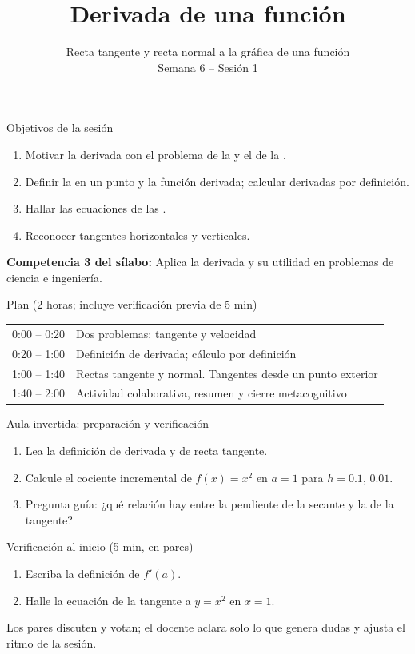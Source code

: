 \documentclass[10pt,aspectratio=169]{beamer}
\title[La derivada]{Derivada de una función}
\subtitle{Recta tangente y recta normal a la gráfica de una función\\[2pt]\small Semana 6 -- Sesión 1}
\begin{document}
\begin{frame}
  \titlepage
\end{frame}

\begin{frame}{Objetivos de la sesión}
  \begin{enumerate}
    \item Motivar la derivada con el problema de la  y el de la .
    \item Definir la  en un punto y la función derivada; calcular derivadas por definición.
    \item Hallar las ecuaciones de las .
    \item Reconocer tangentes horizontales y verticales.
  \end{enumerate}
  \vspace{1mm}
  {\small\textbf{Competencia 3 del sílabo:} Aplica la derivada y su utilidad en problemas de ciencia e ingeniería.}
  \begin{block}{Plan (2 horas; incluye verificación previa de 5 min)}
    \begin{tabular}{ll}
      0:00 -- 0:20 & Dos problemas: tangente y velocidad\\
      0:20 -- 1:00 & Definición de derivada; cálculo por definición\\
      1:00 -- 1:40 & Rectas tangente y normal. Tangentes desde un punto exterior\\
      1:40 -- 2:00 & Actividad colaborativa, resumen y cierre metacognitivo
    \end{tabular}
  \end{block}
\end{frame}

\begin{frame}{Aula invertida: preparación y verificación}
  \small
  \begin{previa}
    \begin{enumerate}
      \item Lea la definición de derivada y de recta tangente.
      \item Calcule el cociente incremental de $f(x)=x^2$ en $a=1$ para $h=0.1,\,0.01$.
      \item Pregunta guía: ¿qué relación hay entre la pendiente de la secante y la de la tangente?
    \end{enumerate}
  \end{previa}
  \begin{block}{Verificación al inicio (5 min, en pares)}
    \begin{enumerate}
      \item Escriba la definición de $f'(a)$.
      \item Halle la ecuación de la tangente a $y=x^2$ en $x=1$.
    \end{enumerate}
    Los pares discuten y votan; el docente aclara solo lo que genera dudas y ajusta el ritmo de la sesión.
  \end{block}
\end{frame}
\end{document}
